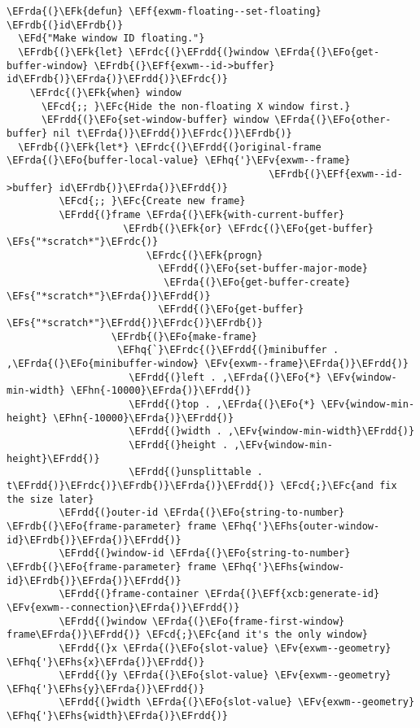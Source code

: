 \documentclass[a4wide,10pt]{article}
\newcommand{\EFc}[1]{\textcolor{EFc}{#1}} %
\newcommand{\EFcd}[1]{\textcolor{EFcd}{#1}} %
\newcommand{\EFs}[1]{\textcolor{EFs}{#1}} %
\newcommand{\EFd}[1]{\textcolor{EFd}{#1}} %
\newcommand{\EFk}[1]{\textcolor{EFk}{#1}} %
\newcommand{\EFf}[1]{\textcolor{EFf}{#1}} %
\newcommand{\EFv}[1]{\textcolor{EFv}{#1}} %
\newcommand{\EFo}[1]{\textcolor{EFo}{#1}} %
\newcommand{\EFhn}[1]{\textcolor{EFhn}{\textbf{#1}}} %
\newcommand{\EFhq}[1]{\textcolor{EFhq}{#1}} %
\newcommand{\EFhs}[1]{\textcolor{EFhs}{#1}} %
\newcommand{\EFrda}[1]{\textcolor{EFrda}{#1}} %
\newcommand{\EFrdb}[1]{\textcolor{EFrdb}{#1}} %
\newcommand{\EFrdc}[1]{\textcolor{EFrdc}{#1}} %
\newcommand{\EFrdd}[1]{\textcolor{EFrdd}{#1}} %
\begin{document}
\begin{Code}
\begin{Verbatim}
\EFrda{(}\EFk{defun} \EFf{exwm-floating--set-floating} \EFrdb{(}id\EFrdb{)}
  \EFd{"Make window ID floating."}
  \EFrdb{(}\EFk{let} \EFrdc{(}\EFrdd{(}window \EFrda{(}\EFo{get-buffer-window} \EFrdb{(}\EFf{exwm--id->buffer} id\EFrdb{)}\EFrda{)}\EFrdd{)}\EFrdc{)}
    \EFrdc{(}\EFk{when} window
      \EFcd{;; }\EFc{Hide the non-floating X window first.}
      \EFrdd{(}\EFo{set-window-buffer} window \EFrda{(}\EFo{other-buffer} nil t\EFrda{)}\EFrdd{)}\EFrdc{)}\EFrdb{)}
  \EFrdb{(}\EFk{let*} \EFrdc{(}\EFrdd{(}original-frame \EFrda{(}\EFo{buffer-local-value} \EFhq{'}\EFv{exwm--frame}
                                             \EFrdb{(}\EFf{exwm--id->buffer} id\EFrdb{)}\EFrda{)}\EFrdd{)}
         \EFcd{;; }\EFc{Create new frame}
         \EFrdd{(}frame \EFrda{(}\EFk{with-current-buffer}
                    \EFrdb{(}\EFk{or} \EFrdc{(}\EFo{get-buffer} \EFs{"*scratch*"}\EFrdc{)}
                        \EFrdc{(}\EFk{progn}
                          \EFrdd{(}\EFo{set-buffer-major-mode}
                           \EFrda{(}\EFo{get-buffer-create} \EFs{"*scratch*"}\EFrda{)}\EFrdd{)}
                          \EFrdd{(}\EFo{get-buffer} \EFs{"*scratch*"}\EFrdd{)}\EFrdc{)}\EFrdb{)}
                  \EFrdb{(}\EFo{make-frame}
                   \EFhq{`}\EFrdc{(}\EFrdd{(}minibuffer . ,\EFrda{(}\EFo{minibuffer-window} \EFv{exwm--frame}\EFrda{)}\EFrdd{)}
                     \EFrdd{(}left . ,\EFrda{(}\EFo{*} \EFv{window-min-width} \EFhn{-10000}\EFrda{)}\EFrdd{)}
                     \EFrdd{(}top . ,\EFrda{(}\EFo{*} \EFv{window-min-height} \EFhn{-10000}\EFrda{)}\EFrdd{)}
                     \EFrdd{(}width . ,\EFv{window-min-width}\EFrdd{)}
                     \EFrdd{(}height . ,\EFv{window-min-height}\EFrdd{)}
                     \EFrdd{(}unsplittable . t\EFrdd{)}\EFrdc{)}\EFrdb{)}\EFrda{)}\EFrdd{)} \EFcd{;}\EFc{and fix the size later}
         \EFrdd{(}outer-id \EFrda{(}\EFo{string-to-number} \EFrdb{(}\EFo{frame-parameter} frame \EFhq{'}\EFhs{outer-window-id}\EFrdb{)}\EFrda{)}\EFrdd{)}
         \EFrdd{(}window-id \EFrda{(}\EFo{string-to-number} \EFrdb{(}\EFo{frame-parameter} frame \EFhq{'}\EFhs{window-id}\EFrdb{)}\EFrda{)}\EFrdd{)}
         \EFrdd{(}frame-container \EFrda{(}\EFf{xcb:generate-id} \EFv{exwm--connection}\EFrda{)}\EFrdd{)}
         \EFrdd{(}window \EFrda{(}\EFo{frame-first-window} frame\EFrda{)}\EFrdd{)} \EFcd{;}\EFc{and it's the only window}
         \EFrdd{(}x \EFrda{(}\EFo{slot-value} \EFv{exwm--geometry} \EFhq{'}\EFhs{x}\EFrda{)}\EFrdd{)}
         \EFrdd{(}y \EFrda{(}\EFo{slot-value} \EFv{exwm--geometry} \EFhq{'}\EFhs{y}\EFrda{)}\EFrdd{)}
         \EFrdd{(}width \EFrda{(}\EFo{slot-value} \EFv{exwm--geometry} \EFhq{'}\EFhs{width}\EFrda{)}\EFrdd{)}

\end{Verbatim}
\end{Code}
\end{document}
